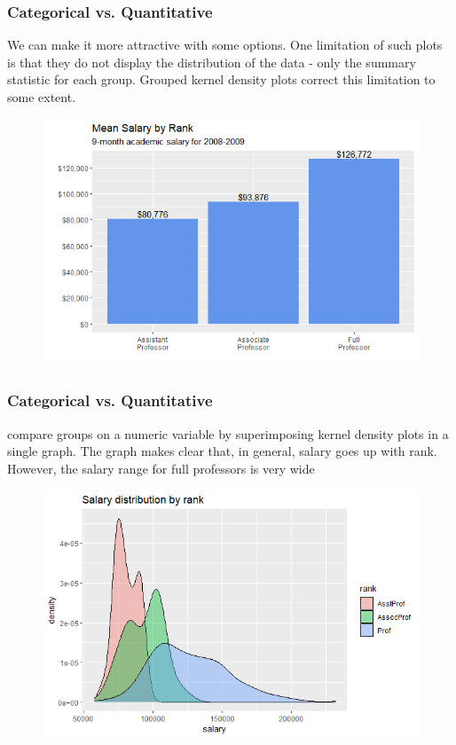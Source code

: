 \documentclass{beamer}
\begin{document}

\begin{frame}[fragile] %
\frametitle{Categorical vs. Quantitative}

\begin{example} 
We can make it more attractive with some options.
One limitation of such plots is that they do not display the distribution of the data - only the summary statistic for each group. Grouped kernel density plots correct this limitation to some extent.


\end{example}
\begin{figure}
\includegraphics[width=0.6\linewidth]{Seminar_3_images/R/09.png}
\end{figure}
\end{frame}


\begin{frame}[fragile] %
\frametitle{Categorical vs. Quantitative}

\begin{example} 
compare groups on a numeric variable by superimposing kernel density plots in a single graph.
 The graph makes clear that, in general, salary goes up with rank. However, the salary range for full professors is very wide
\end{example}
\begin{figure}
\includegraphics[width=0.6\linewidth]{Seminar_3_images/R/10.png}
\end{figure}
\end{frame}
\end{document}
